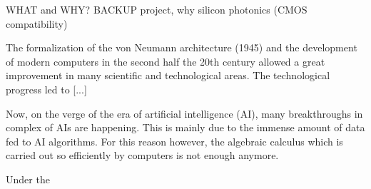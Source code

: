 WHAT and WHY?
BACKUP project, why silicon photonics (CMOS compatibility)
\vspace*{2em}

The formalization of the von Neumann architecture (1945) and the development of modern computers in the second half the 20th century allowed a great improvement in many scientific and technological areas.
The technological progress led to [...]

\vspace*{2em}
Now, on the verge of the era of artificial intelligence (AI), many breakthroughs in complex of AIs are happening.
This is mainly due to the immense amount of data fed to AI algorithms.
For this reason however, the algebraic calculus which is carried out so efficiently by computers is not enough anymore.

\vspace*{2em}
Under the